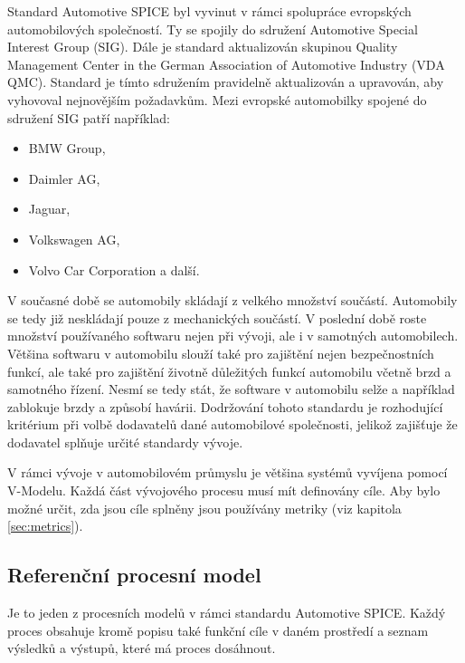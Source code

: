 \documentclass[czech,master,public,dept460,male,cpdeclaration,oneside]{diploma}
\begin{document}
Standard Automotive SPICE byl vyvinut v rámci spolupráce evropských automobilových společností. Ty se spojily do sdružení Automotive Special Interest Group (SIG). Dále je standard aktualizován skupinou Quality Management Center in the German Association of Automotive Industry (VDA QMC). Standard je tímto sdružením pravidelně aktualizován a upravován, aby vyhovoval nejnovějším požadavkům. Mezi evropské automobilky spojené do sdružení SIG patří například:

\begin{itemize}
  \item BMW Group,
  \item Daimler AG,
  \item Jaguar,
  \item Volkswagen AG,
  \item Volvo Car Corporation a další.
\end{itemize}

V současné době se automobily skládají z velkého množství součástí. Automobily se tedy již neskládají pouze z mechanických součástí. V poslední době roste množství používaného softwaru nejen při vývoji, ale i v samotných automobilech. Většina softwaru v automobilu slouží také pro zajištění nejen bezpečnostních funkcí, ale také pro zajištění životně důležitých funkcí automobilu včetně brzd a samotného řízení. Nesmí se tedy stát, že software v automobilu selže a například zablokuje brzdy a způsobí havárii. Dodržování tohoto standardu je rozhodující kritérium při volbě dodavatelů dané automobilové společnosti, jelikož zajišťuje že dodavatel splňuje určité standardy vývoje.

V rámci vývoje v automobilovém průmyslu je většina systémů vyvíjena pomocí V-Modelu. Každá část  vývojového procesu musí mít definovány cíle. Aby bylo možné určit, zda jsou cíle splněny jsou používány metriky (viz kapitola \ref{sec:metrics}). 

\subsection{Referenční procesní model}
Je to jeden z procesních modelů v rámci standardu Automotive SPICE. 
Každý proces obsahuje kromě popisu také funkční cíle v daném prostředí a seznam výsledků a výstupů, které má proces dosáhnout.
\cite{ref:aspice_download_procesni_modely}
\end{document}
